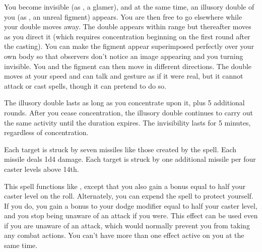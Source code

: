\spelleffect You become invisible (as , a glamer), and at the same time, an illusory double of you (as , an unreal figment) appears. You are then free to go elsewhere while your double moves away. The double appears within range but thereafter moves as you direct it (which requires concentration beginning on the first round after the casting). You can make the figment appear superimposed perfectly over your own body so that observers don't notice an image appearing and you turning invisible. You and the figment can then move in different directions. The double moves at your speed and can talk and gesture as if it were real, but it cannot attack or cast spells, though it can pretend to do so.
\par The illusory double lasts as long as you concentrate upon it, plus 5 additional rounds. After you cease concentration, the illusory double continues to carry out the same activity until the duration expires. The invisibility lasts for 5 minutes, regardless of concentration.

\spelleffect Each target is struck by seven missiles like those created by the  spell. Each missile deals 1d4 damage. Each target is struck by one additional missile per four caster levels above 14th.

\spelleffect This spell functions like , except that you also gain a bonus equal to half your caster level on the roll. Alternately, you can expend the spell to protect yourself. If you do, you gain a bonus to your dodge modifier equal to half your caster level, and you stop being unaware of an attack if you were. This effect can be used even if you are unaware of an attack, which would normally prevent you from taking any combat actions.
\spellnotes You can't have more than one  effect active on you at the same time.

